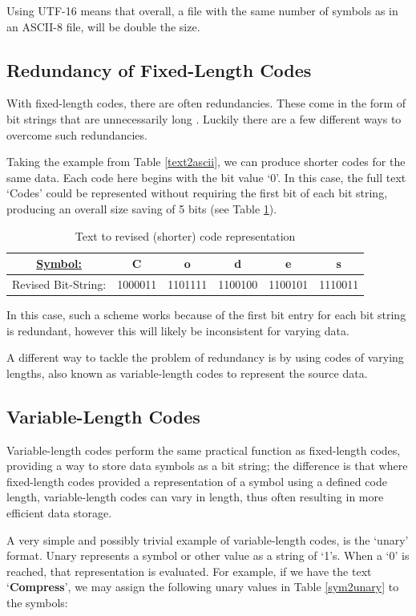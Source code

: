 \documentclass[12pt]{article}
\begin{document}
Using UTF-16 means that overall, a file with the same number of symbols as in an ASCII-8 file, will be double the size.

\subsection{Redundancy of Fixed-Length Codes}
With fixed-length codes, there are often redundancies. These come in the form of bit strings that are unnecessarily long \citep[p.~2-5]{dc_complete_ref}. Luckily there are a few different ways to overcome such redundancies. 

Taking the example from Table \ref{text2ascii}, we can produce shorter codes for the same data. Each code here begins with the bit value `0'. In this case, the full text `Codes' could be represented without requiring the first bit of each bit string, producing an overall size saving of 5 bits (see Table \ref{text2shorter}).

\begin{table}[H]
	\centering
	\begin{tabular}{|c|c|c|c|c|c|}
		\hline
		\underline{Symbol:} & C & o & d & e & s \\
		\hline
		Revised Bit-String: & ‭1000011‬ & ‭1101111‬ & ‭1100100‬ & ‭1100101‬ & ‭1110011‬ \\
		\hline
	\end{tabular}
	\caption{Text to revised (shorter) code representation}
	\label{text2shorter}
\end{table}

In this case, such a scheme works because of the first bit entry for each bit string is redundant, however this will likely be inconsistent for varying data.

A different way to tackle the problem of redundancy is by using codes of varying lengths, also known as variable-length codes to represent the source data.

\subsection{Variable-Length Codes}
Variable-length codes perform the same practical function as fixed-length codes, providing a way to store data symbols as a bit string; the difference is that where fixed-length codes provided a representation of a symbol using a defined code length, variable-length codes can vary in length, thus often resulting in more efficient data storage.

A very simple and possibly trivial example of variable-length codes, is the `unary' format. Unary represents a symbol or other value as a string of `1's. When a `0' is reached, that representation is evaluated. For example, if we have the text `\textbf{Compress}', we may assign the following unary values in Table \ref{sym2unary} to the symbols:
\end{document}
